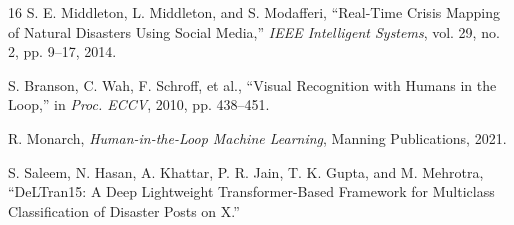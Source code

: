 \documentclass[pdflatex,sn-mathphys-num]{sn-jnl}
\theoremstyle{thmstyleone}%
\theoremstyle{thmstyletwo}%
\theoremstyle{thmstylethree}%
\begin{document}
\begin{thebibliography}{16}
S. E. Middleton, L. Middleton, and S. Modafferi, ``Real-Time Crisis Mapping of Natural Disasters Using Social Media,'' \textit{IEEE Intelligent Systems}, vol. 29, no. 2, pp. 9--17, 2014.

S. Branson, C. Wah, F. Schroff, et al., ``Visual Recognition with Humans in the Loop,'' in \textit{Proc. ECCV}, 2010, pp. 438--451.

R. Monarch, \textit{Human-in-the-Loop Machine Learning}, Manning Publications, 2021.

S. Saleem, N. Hasan, A. Khattar, P. R. Jain, T. K. Gupta, and M. Mehrotra, 
``DeLTran15: A Deep Lightweight Transformer-Based Framework for Multiclass Classification of Disaster Posts on X.''

\end{thebibliography}
\end{document}
